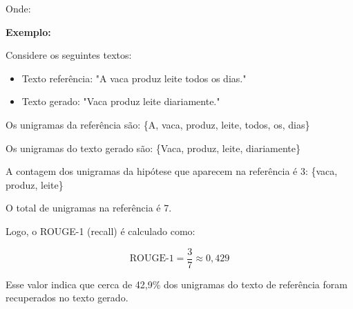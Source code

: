 Onde:

\textbf{Exemplo:}

Considere os seguintes textos:

\begin{itemize}
    \item Texto referência: "A vaca produz leite todos os dias."
    \item Texto gerado: "Vaca produz leite diariamente."
\end{itemize}

Os unigramas da referência são: \{A, vaca, produz, leite, todos, os, dias\}

Os unigramas do texto gerado são: \{Vaca, produz, leite, diariamente\}

A contagem dos unigramas da hipótese que aparecem na referência é 3: \{vaca, produz, leite\}

O total de unigramas na referência é 7.

Logo, o ROUGE-1 (recall) é calculado como:

\[
\text{ROUGE-1} = \frac{3}{7} \approx 0{,}429
\]

Esse valor indica que cerca de 42,9\% dos unigramas do texto de referência foram recuperados no texto gerado.

